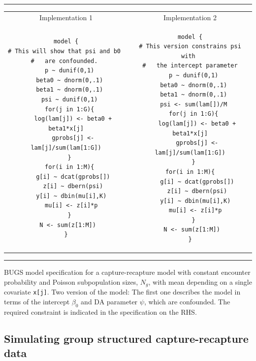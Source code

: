 \begin{panel}[htp]   
\renewcommand{\baselinestretch}{1.0}
\centering
\rule[0.15in]{\textwidth}{.03in}
\begin{tabular}{cc}
Implementation 1 & Implementation 2 \\
\begin{minipage}{2.75in}
{\small
\begin{verbatim}
model {
# This will show that psi and b0 
#   are confounded. 
  p ~ dunif(0,1)
  beta0 ~ dnorm(0,.1)
  beta1 ~ dnorm(0,.1)
  psi ~ dunif(0,1)
  for(j in 1:G){
    log(lam[j]) <- beta0 + beta1*x[j]
    gprobs[j] <- lam[j]/sum(lam[1:G])
  }
  for(i in 1:M){
    g[i] ~ dcat(gprobs[])
    z[i] ~ dbern(psi)
   y[i] ~ dbin(mu[i],K)
   mu[i] <- z[i]*p
  }
  N <- sum(z[1:M]) 
}
\end{verbatim}
}
\end{minipage}
&
\begin{minipage}{2.75in}
{\small
\begin{verbatim}
model {
# This version constrains psi with 
#   the intercept parameter
  p ~ dunif(0,1)
  beta0 ~ dnorm(0,.1)
  beta1 ~ dnorm(0,.1)
  psi <- sum(lam[])/M
  for(j in 1:G){
    log(lam[j]) <- beta0 + beta1*x[j]
    gprobs[j] <- lam[j]/sum(lam[1:G])
  }
  for(i in 1:M){  
    g[i] ~ dcat(gprobs[])
    z[i] ~ dbern(psi)
   y[i] ~ dbin(mu[i],K)
   mu[i] <- z[i]*p
  }
  N <- sum(z[1:M]) 
}
\end{verbatim}
}
\end{minipage}
\end{tabular}
\rule[-0.15in]{\textwidth}{.03in}
\caption{BUGS model specification for a capture-recapture model with
  constant encounter probability and Poisson subpopulation sizes,
  $N_{g}$, with mean depending on a single covariate \mbox{\tt x[j]}. 
Two version of the model: The first one describes the model in terms
of the intercept $\beta_0$ and DA parameter $\psi$, which are
confounded. The required constraint is indicated in the specification
on the RHS. 
}
\label{panel.wbcode}
\end{panel}

\subsection{
Simulating group structured 
capture-recapture data
}


